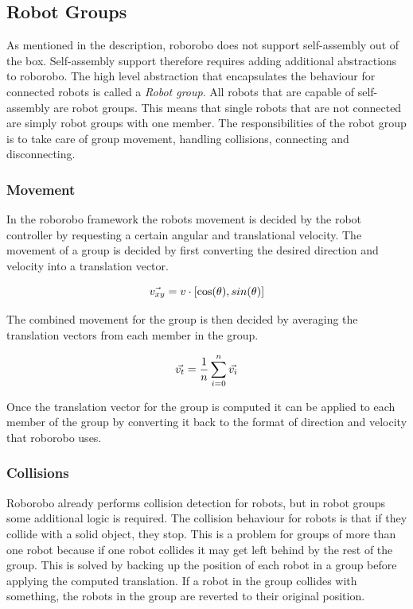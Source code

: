 \subsection{Robot Groups}
As mentioned in the description, roborobo does not support self-assembly out of the box.
Self-assembly support therefore requires adding additional abstractions to roborobo.
The high level abstraction that encapsulates the behaviour for connected robots is called a \emph{Robot group}.
All robots that are capable of self-assembly are robot groups.
This means that single robots that are not connected are simply robot groups with one member.
The responsibilities of the robot group is to take care of group movement, handling collisions, connecting and disconnecting. 
	
\subsubsection{Movement}
In the roborobo framework the robots movement is decided by the robot controller by requesting a certain angular and translational velocity.
The movement of a group is decided by first converting the desired direction and velocity into a translation vector.
	
\begin{equation}
	\centering
	\vec{v_{xy}} = v\cdot[\cos(\theta), sin(\theta)]
\end{equation}
	
The combined movement for the group is then decided by averaging the translation vectors from each member in the group.
	
\begin{equation}
	\centering
	\vec{v_t} = \frac{1}{n}\sum_{i=0}^{n} \vec{v_{i}}
\end{equation}
	
Once the translation vector for the group is computed it can be applied to each member of the group by converting it back to the format of direction and velocity that roborobo uses.
	
\subsubsection{Collisions}
Roborobo already performs collision detection for robots, but in robot groups some additional logic is required.
The collision behaviour for robots is that if they collide with a solid object, they stop.
This is a problem for groups of more than one robot because if one robot collides it may get left behind by the rest of the group.
This is solved by backing up the position of each robot in a group before applying the computed translation.
If a robot in the group collides with something, the robots in the group are reverted to their original position.

